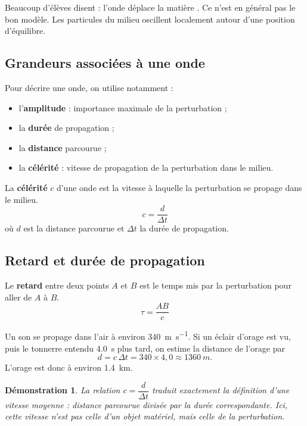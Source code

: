 \documentclass[11pt,a4paper]{article}
\newtheorem*{demonstration}{Démonstration}
\begin{document}
\begin{attentionbox}
Beaucoup d'élèves disent : \og l'onde déplace la matière \fg. Ce n'est en général pas le bon modèle. Les particules du milieu oscillent localement autour d'une position d'équilibre.
\end{attentionbox}

\subsection{Grandeurs associées à une onde}
Pour décrire une onde, on utilise notamment :
\begin{itemize}
    \item l'\textbf{amplitude} : importance maximale de la perturbation ;
    \item la \textbf{durée} de propagation ;
    \item la \textbf{distance} parcourue ;
    \item la \textbf{célérité} : vitesse de propagation de la perturbation dans le milieu.
\end{itemize}

\begin{definitionbox}
La \textbf{célérité} $c$ d'une onde est la vitesse à laquelle la perturbation se propage dans le milieu.
\[
 c = \frac{d}{\Delta t}
\]
où $d$ est la distance parcourue et $\Delta t$ la durée de propagation.
\end{definitionbox}

\subsection{Retard et durée de propagation}

\begin{definitionbox}
Le \textbf{retard} entre deux points $A$ et $B$ est le temps mis par la perturbation pour aller de $A$ à $B$.
\[
\tau = \frac{AB}{c}
\]
\end{definitionbox}

\begin{exemplebox}
Un son se propage dans l'air à environ \SI{340}{m.s^{-1}}. Si un éclair d'orage est vu, puis le tonnerre entendu \SI{4,0}{s} plus tard, on estime la distance de l'orage par
\[
 d = c\,\Delta t = 340\times 4,0 \approx \SI{1360}{m}.
\]
L'orage est donc à environ \SI{1,4}{km}.
\end{exemplebox}

\begin{demonstration}
La relation $c=\dfrac{d}{\Delta t}$ traduit exactement la définition d'une vitesse moyenne : distance parcourue divisée par la durée correspondante. Ici, cette vitesse n'est pas celle d'un objet matériel, mais celle de la perturbation.
\end{demonstration}
\end{document}
